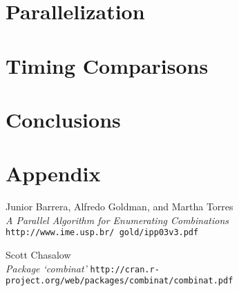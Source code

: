 \documentclass[12pt]{article}
\begin{document}
{\section{Parallelization}

%



%

\section{Timing Comparisons}

\section{Conclusions}




\newpage

\appendix

\section{Appendix}



\newpage


\begin{thebibliography}{9}
Junior Barrera, Alfredo Goldman, and Martha Torres\\
\textit{A Parallel Algorithm for Enumerating Combinations}
\texttt{http://www.ime.usp.br/~gold/ipp03v3.pdf}
 
Scott Chasalow\\
\textit{Package `combinat'}
\texttt{http://cran.r-project.org/web/packages/combinat/combinat.pdf}
 

\end{thebibliography}


}
\end{document}
